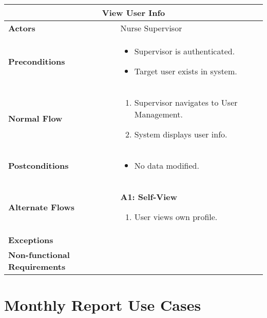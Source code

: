 \documentclass{article}
\begin{document}
\renewcommand{\arraystretch}{1.3} %

\begin{longtable}{| p{5cm} | p{10cm} |}
    \hline
    \multicolumn{2}{|c|}{\textbf{View User Info}} \\
    \hline
    \textbf{Actors} & Nurse Supervisor \\
    \hline
    \textbf{Preconditions} & 
    \begin{itemize}
        \item Supervisor is authenticated.
        \item Target user exists in system.
    \end{itemize} \\
    \hline
    \textbf{Normal Flow} & 
    \begin{enumerate}
        \item Supervisor navigates to User Management.
        \item System displays user info.
    \end{enumerate} \\
    \hline
    \textbf{Postconditions} & 
    \begin{itemize}
        \item No data modified.
    \end{itemize} \\
    \hline
    \textbf{Alternate Flows} & 
    \textbf{A1: Self-View}  
    \begin{enumerate}
        \item User views own profile.
    \end{enumerate} \\
    \hline
    \textbf{Exceptions} &  \\
    \hline
    \textbf{Non-functional Requirements} &  \\
    \hline
\end{longtable}

\section{Monthly Report Use Cases}
\renewcommand{\arraystretch}{1.3} %
\end{document}
